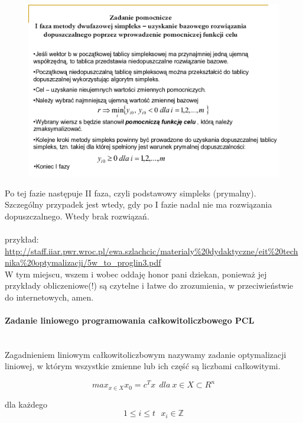 \documentclass[a4paper,twoside]{report}
\begin{document}
	\begin{figure}[H]
		\includegraphics[scale=0.7
		]{obrazy/optymalizacja/opt5.png}
	\end{figure} 
	
	Po tej fazie następuje II faza, czyli podstawowy simpleks (prymalny).\\
	
	Szczególny przypadek jest wtedy, gdy po I fazie nadal nie ma rozwiązania dopuszczalnego. Wtedy brak rozwiązań.\\
	\\
	przykład:\\
	\url{http://staff.iiar.pwr.wroc.pl/ewa.szlachcic/materialy%20dydaktyczne/eit%20technika%20optymalizacji/5w_to_proglin3.pdf}
		\\
		
		W tym  miejscu, wszem i wobec oddaję honor pani dziekan, ponieważ jej przykłady obliczeniowe(!) są czytelne i łatwe do zrozumienia, w przeciwieństwie do internetowych, amen.
		
		\paragraph{Zadanie liniowego programowania całkowitoliczbowego PCL\\\\}
		
		Zagadnieniem liniowym całkowitoliczbowym nazywamy zadanie optymalizacji
		liniowej, w którym wszystkie zmienne lub ich część są liczbami całkowitymi.
		
		\[max_{x \in X} x_0 = c^Tx~~dla~x \in X \subset R^n\]
		
		
		dla każdego $$1 \le i \le t~~~x_i \in \mathbb{Z}$$
		
\end{document}
